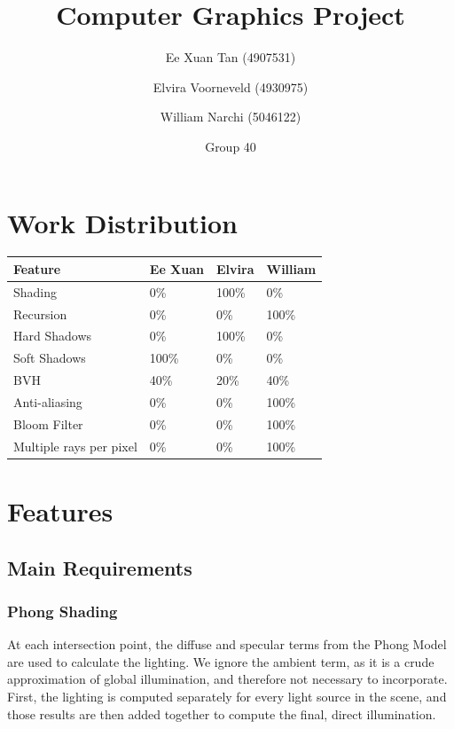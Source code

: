 \documentclass{article}
\author{Ee Xuan Tan (4907531) \and Elvira Voorneveld (4930975) \and William Narchi (5046122)}
\date{Group 40} %
\title{Computer Graphics Project}
\begin{document}
    \maketitle

    \section{Work Distribution}
    
    \begin{tabular}{ |p{2.5cm}||p{2.5cm}|p{2.5cm}|p{2.5cm}| }
        \hline
        \textbf{Feature} &\textbf{Ee Xuan} &\textbf{Elvira} &\textbf{William}\\
        \hline
        Shading                         &0\%    &100\%  &0\%\\
        Recursion                       &0\%    &0\%    &100\%\\
        Hard Shadows                    &0\%    &100\%  &0\%\\
        Soft Shadows                    &100\%  &0\%    &0\%\\
        BVH                             &40\%  &20\%    &40\%\\
        Anti-aliasing                   &0\%    &0\%    &100\%\\
        Bloom Filter                    &0\%    &0\%    &100\%\\
        Multiple rays per pixel         &0\%    &0\%    &100\%\\
        \hline
    \end{tabular}

    \section{Features}
    \subsection{Main Requirements}
    \subsubsection{Phong Shading}
    At each intersection point, the diffuse and specular terms from the Phong Model are used to calculate the lighting.
    We ignore the ambient term, as it is a crude approximation of global illumination, and therefore not necessary to incorporate.
    First, the lighting is computed separately for every light source in the scene, 
    and those results are then added together to compute the final, direct illumination.
\end{document}
